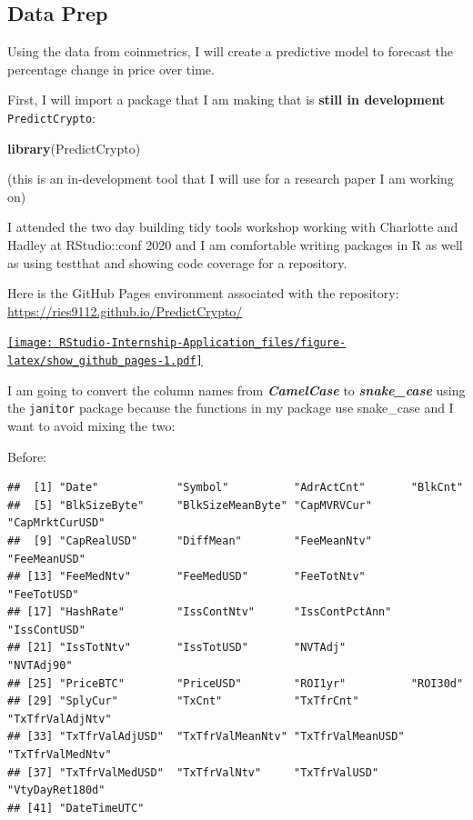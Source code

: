 \documentclass[
]{book}
\newenvironment{Shaded}{\begin{snugshade}}{\end{snugshade}}
\newcommand{\KeywordTok}[1]{\textcolor[rgb]{0.13,0.29,0.53}{\textbf{#1}}}
\newcommand{\NormalTok}[1]{#1}
\begin{document}
\hypertarget{data-prep}{%
\subsection{Data Prep}\label{data-prep}}

Using the data from coinmetrics, I will create a predictive model to forecast the percentage change in price over time.

First, I will import a package that I am making that is \textbf{still in development} \texttt{PredictCrypto}:

\begin{Shaded}
\begin{Highlighting}[]
\KeywordTok{library}\NormalTok{(PredictCrypto)}
\end{Highlighting}
\end{Shaded}

(this is an in-development tool that I will use for a research paper I am working on)

I attended the two day building tidy tools workshop working with Charlotte and Hadley at RStudio::conf 2020 and I am comfortable writing packages in R as well as using testthat and showing code coverage for a repository.

Here is the GitHub Pages environment associated with the repository: \url{https://ries9112.github.io/PredictCrypto/}

\href{https://ries9112.github.io/PredictCrypto/}{\texttt{[image: RStudio-Internship-Application\_files/figure-latex/show\_github\_pages-1.pdf]}}

I am going to convert the column names from \textbf{\emph{CamelCase}} to \textbf{\emph{snake\_case}} using the \texttt{janitor}\citep{R-janitor} package because the functions in my package use snake\_case and I want to avoid mixing the two:

Before:

\begin{verbatim}
##  [1] "Date"            "Symbol"          "AdrActCnt"       "BlkCnt"         
##  [5] "BlkSizeByte"     "BlkSizeMeanByte" "CapMVRVCur"      "CapMrktCurUSD"  
##  [9] "CapRealUSD"      "DiffMean"        "FeeMeanNtv"      "FeeMeanUSD"     
## [13] "FeeMedNtv"       "FeeMedUSD"       "FeeTotNtv"       "FeeTotUSD"      
## [17] "HashRate"        "IssContNtv"      "IssContPctAnn"   "IssContUSD"     
## [21] "IssTotNtv"       "IssTotUSD"       "NVTAdj"          "NVTAdj90"       
## [25] "PriceBTC"        "PriceUSD"        "ROI1yr"          "ROI30d"         
## [29] "SplyCur"         "TxCnt"           "TxTfrCnt"        "TxTfrValAdjNtv" 
## [33] "TxTfrValAdjUSD"  "TxTfrValMeanNtv" "TxTfrValMeanUSD" "TxTfrValMedNtv" 
## [37] "TxTfrValMedUSD"  "TxTfrValNtv"     "TxTfrValUSD"     "VtyDayRet180d"  
## [41] "DateTimeUTC"
\end{verbatim}
\end{document}
